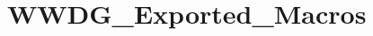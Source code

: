 \hypertarget{group___w_w_d_g___exported___macros}{}\section{W\+W\+D\+G\+\_\+\+Exported\+\_\+\+Macros}
\label{group___w_w_d_g___exported___macros}
